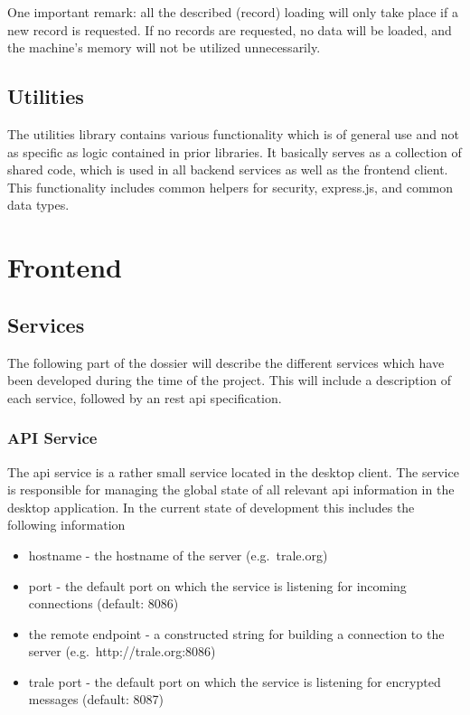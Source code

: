 One important remark: all the described (record) loading will only take place if a new record is requested.
If no records are requested, no data will be loaded, and the machine's memory will not be utilized unnecessarily.

\subsection{Utilities}\label{subsec:utilities}
The utilities library contains various functionality which is of general use and not as specific as logic contained in
prior libraries.
It basically serves as a collection of shared code, which is used in all backend services as well as the frontend
client.
This functionality includes common helpers for security, express.js, and common data types.

\section{Frontend}\label{sec:frontend}

\subsection{Services}\label{subsec:services}

The following part of the dossier will describe the different services which have been developed during the time of the project.
This will include a description of each service, followed by an \ac{rest} \ac{api} specification.

\subsubsection{API Service}\label{subsubsec:api-service}

The \ac{api} service is a rather small service located in the desktop client.
The service is responsible for managing the global state of all relevant \ac{api} information in the desktop application.
In the current state of development this includes the following information

\begin{itemize}\setlength\itemsep{-0.5em}
    \item hostname - the hostname of the server (e.g.\ trale.org)
    \item port - the default port on which the service is listening for incoming connections (default: 8086)
    \item the remote endpoint - a constructed string for building a connection to the server (e.g.\ http://trale.org:8086)
    \item trale port - the default port on which the service is listening for encrypted messages (default: 8087)
\end{itemize}

